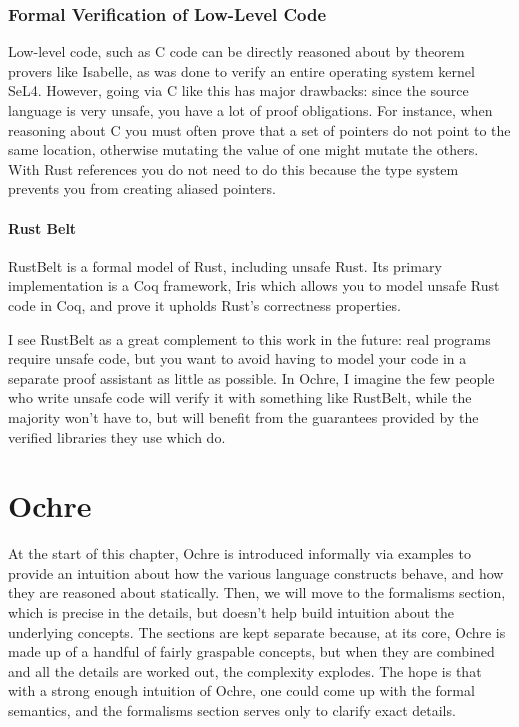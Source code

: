 \documentclass[12pt,twoside]{report}
\begin{document}
\subsection{Formal Verification of Low-Level Code}
Low-level code, such as C code can be directly reasoned about by theorem provers like Isabelle, as was done to verify an entire operating system kernel SeL4\citep{klein_sel4_2009}. However, going via C like this has major drawbacks: since the source language is very unsafe, you have a lot of proof obligations. For instance, when reasoning about C you must often prove that a set of pointers do not point to the same location, otherwise mutating the value of one might mutate the others. With Rust references you do not need to do this because the type system prevents you from creating aliased pointers.

\subsubsection{Rust Belt}
RustBelt\citep{jung_rustbelt_2018} is a formal model of Rust, including unsafe Rust. Its primary implementation is a Coq framework, Iris\citep{noauthor_iris_nodate} which allows you to model unsafe Rust code in Coq, and prove it upholds Rust's correctness properties.

I see RustBelt as a great complement to this work in the future: real programs require unsafe code, but you want to avoid having to model your code in a separate proof assistant as little as possible. In Ochre, I imagine the few people who write unsafe code will verify it with something like RustBelt, while the majority won't have to, but will benefit from the guarantees provided by the verified libraries they use which do.

\chapter{Ochre}

At the start of this chapter, Ochre is introduced informally via examples to provide an intuition about how the various language constructs behave, and how they are reasoned about statically. Then, we will move to the formalisms section, which is precise in the details, but doesn't help build intuition about the underlying concepts. The sections are kept separate because, at its core, Ochre is made up of a handful of fairly graspable concepts, but when they are combined and all the details are worked out, the complexity explodes. The hope is that with a strong enough intuition of Ochre, one could come up with the formal semantics, and the formalisms section serves only to clarify exact details.
\end{document}

